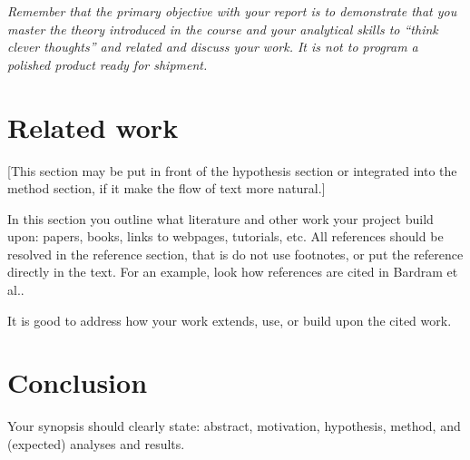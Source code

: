 \documentclass[letter]{article}
\begin{document}
\textit{Remember that the primary objective with your report is to demonstrate
that you master the theory introduced in the course and your
analytical skills to ``think clever thoughts'' and related and discuss
your work. It is not to program a polished product ready for shipment.}


\section{Related work}

[This section may be put in front of the hypothesis section or
  integrated into the method section, if it make the flow of text more
  natural.]

In this section you outline what literature and other work your
project build upon: papers, books, links to webpages, tutorials,
etc. All references should be resolved in the reference section, that
is do not use footnotes, or put the reference directly in the
text. For an example, look how references are cited in Bardram et
al.\cite{bardram}.

It is good to address how your work extends, use, or build upon the
cited work. 

\section{Conclusion}

Your synopsis should clearly state: abstract, motivation, hypothesis,
method, and (expected) analyses and results.






\end{document}
